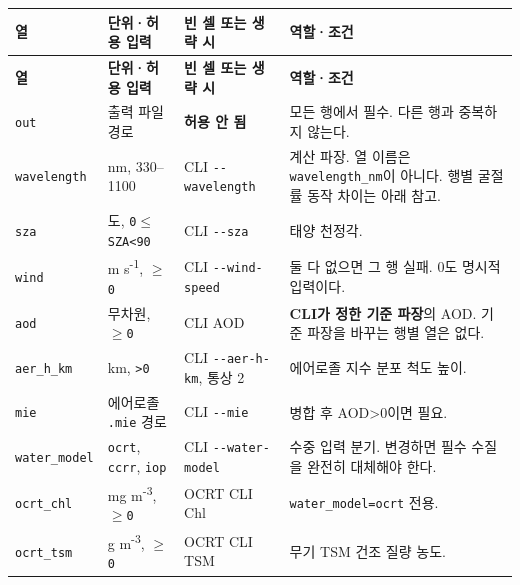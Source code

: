 {\TableFont
\begin{longtable}{@{}>{\raggedright\arraybackslash}p{}>{\raggedright\arraybackslash}p{}>{\raggedright\arraybackslash}p{}>{\raggedright\arraybackslash}p{}@{}}
\toprule
\textbf{열} & \textbf{단위·허용 입력} & \textbf{빈 셀 또는 생략 시} & \textbf{역할·조건} \\
\midrule
\endfirsthead
\toprule
\textbf{열} & \textbf{단위·허용 입력} & \textbf{빈 셀 또는 생략 시} & \textbf{역할·조건} \\
\midrule
\endhead
\bottomrule
\endfoot
\texttt{out} & 출력 파일 경로 & \textbf{허용 안 됨} & 모든 행에서 필수. 다른 행과 중복하지 않는다. \\
\texttt{wavelength} & nm, 330--1100 & CLI \texttt{-\allowbreak{}-\allowbreak{}wavelength} & 계산 파장. 열 이름은 \texttt{wavelength\_\allowbreak{}nm}이 아니다. 행별 굴절률 동작 차이는 아래 참고. \\
\texttt{sza} & 도, \texttt{0\ensuremath{\leq}SZA<90} & CLI \texttt{-\allowbreak{}-\allowbreak{}sza} & 태양 천정각. \\
\texttt{wind} & m s\textsuperscript{-}\textsuperscript{1}, \texttt{\ensuremath{\geq}0} & CLI \texttt{-\allowbreak{}-\allowbreak{}wind-\allowbreak{}speed} & 둘 다 없으면 그 행 실패. 0도 명시적 입력이다. \\
\texttt{aod} & 무차원, \texttt{\ensuremath{\geq}0} & CLI AOD & \textbf{CLI가 정한 기준 파장}의 AOD. 기준 파장을 바꾸는 행별 열은 없다. \\
\texttt{aer\_\allowbreak{}h\_\allowbreak{}km} & km, \texttt{>0} & CLI \texttt{-\allowbreak{}-\allowbreak{}aer-\allowbreak{}h-\allowbreak{}km}, 통상 2 & 에어로졸 지수 분포 척도 높이. \\
\texttt{mie} & 에어로졸 \texttt{.\allowbreak{}mie} 경로 & CLI \texttt{-\allowbreak{}-\allowbreak{}mie} & 병합 후 AOD>0이면 필요. \\
\texttt{water\_\allowbreak{}model} & \texttt{ocrt}, \texttt{ccrr}, \texttt{iop} & CLI \texttt{-\allowbreak{}-\allowbreak{}water-\allowbreak{}model} & 수중 입력 분기. 변경하면 필수 수질을 완전히 대체해야 한다. \\
\texttt{ocrt\_\allowbreak{}chl} & mg m\textsuperscript{-}\textsuperscript{3}, \texttt{\ensuremath{\geq}0} & OCRT CLI Chl & \texttt{water\_\allowbreak{}model=\allowbreak{}ocrt} 전용. \\
\texttt{ocrt\_\allowbreak{}tsm} & g m\textsuperscript{-}\textsuperscript{3}, \texttt{\ensuremath{\geq}0} & OCRT CLI TSM & 무기 TSM 건조 질량 농도. \\

\end{longtable}}

